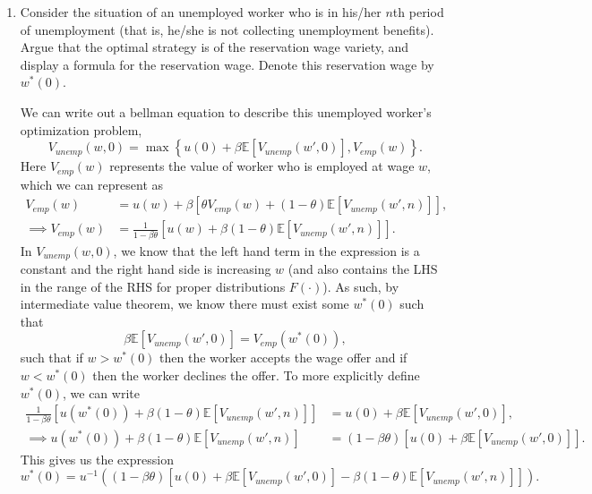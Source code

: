 \documentclass[11pt,english]{article}
\begin{document}
\begin{enumerate}
    \item Consider the situation of an unemployed worker who is in his/her $n$th
        period of unemployment (that is, he/she is not collecting unemployment
        benefits). Argue that the optimal strategy is of the reservation wage
        variety, and display a formula for the reservation wage. Denote this
        reservation wage by $w^*(0)$.
    \begin{solution}
 	We can write out a bellman equation to describe this unemployed worker's optimization problem, $$V_{unemp}(w, 0) = \max\left\{u(0) + \beta \mathbb{E}\left[V_{unemp}(w',0)\right], V_{emp}(w)\right\}.$$ Here $V_{emp}(w)$ represents the value of worker who is employed at wage $w$, which we can represent as 
\begin{align*}
V_{emp}(w) &= u(w) + \beta \left[\theta V_{emp}(w) + (1 - \theta)\mathbb{E}\left[V_{unemp}(w', n)\right]\right],\\
\implies V_{emp}(w) &= \frac{1}{1 - \beta \theta}\left[u(w) + \beta (1 -\theta)\mathbb{E}[V_{unemp}(w',n)]\right].
\end{align*} 
In $V_{unemp}(w,0)$, we know that the left hand term in the expression is a constant and the right hand side is increasing $w$ (and also contains the LHS in the range of the RHS for proper distributions $F(\cdot)$). As such, by intermediate value theorem, we know there must exist some $w^*(0)$ such that  $$\beta \mathbb{E}\left[V_{unemp}(w',0)\right] = V_{emp}(w^*(0)),$$ such that if $w > w^*(0)$ then the worker accepts the wage offer and if $w < w^*(0)$ then the worker declines the offer. To more explicitly define $w^*(0)$, we can write
\begin{align*}
\frac{1}{1 - \beta \theta}\left[u(w^*(0)) + \beta (1 -\theta)\mathbb{E}[V_{unemp}(w',n)]\right] &= u(0) + \beta \mathbb{E}\left[V_{unemp}(w',0)\right],\\
\implies  u(w^*(0)) + \beta (1 -\theta)\mathbb{E}[V_{unemp}(w',n)] &= (1 - \beta \theta) \left[u(0) + \beta\mathbb{E}\left[V_{unemp}(w',0)\right]\right].
\end{align*}This gives us the expression $$\boxed{w^*(0) = u^{-1}\left((1 - \beta \theta) \left[u(0) + \beta\mathbb{E}\left[V_{unemp}(w',0)\right] - \beta (1 -\theta)\mathbb{E}[V_{unemp}(w',n)]\right]\right).}$$
 \end{solution}
 

\end{enumerate}
\end{document}
